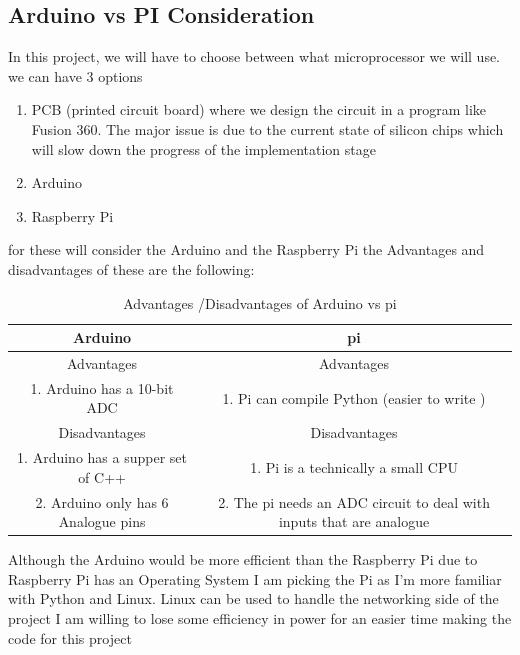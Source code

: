 \subsection{Arduino vs PI Consideration }
In this project, we will have to choose between what microprocessor we will use. we can have 3 options
\begin{enumerate}
	\item PCB (printed circuit board)
	where we design the circuit in a program like Fusion 360. The major issue is due to  the current state of  silicon chips which will slow down  the progress of 
	the implementation stage
	\item Arduino 
	\item Raspberry Pi
\end{enumerate}
for these will consider the Arduino and  the Raspberry Pi	the Advantages and  disadvantages of these are the following:
\begin{table}[h!]
	\centering
	\begin{tabular}{|c|c|}
		\hline
		Arduino & pi \\
	
	\hline \hline
	Advantages & Advantages \\
	\hline \hline
	1. Arduino has a 10-bit ADC & 1. Pi can compile Python (easier to write ) \\

	\hline \hline
	Disadvantages & Disadvantages \\
	\hline \hline
	1. Arduino has a supper set of C++ & 1. Pi is a technically a small CPU \\
	2. Arduino only has 6 Analogue pins  & 2. The pi needs an ADC circuit to deal with inputs that are analogue \\
	
	\hline
	\end{tabular}
	\caption{Advantages /Disadvantages of Arduino vs pi}
	\label{Advantages /Disadvantages of Arduino vs pi}
\end{table}

Although the  Arduino would be more efficient than the Raspberry Pi due to
Raspberry Pi has an Operating System I am picking the Pi as I'm more familiar with Python and Linux. Linux can  be used to handle the networking side  of   the project
I am willing to lose some efficiency in power for an easier time making the code for  this  project 
